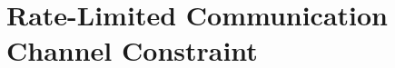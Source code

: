 \documentclass[12pt]{caltech_thesis_finalreport}
\begin{document}
		
\chapter{Rate-Limited Communication Channel Constraint}
\end{document}
